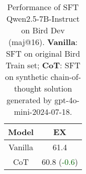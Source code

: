 \begin{table}[h!]
    \centering
\begin{adjustbox}{max width=\columnwidth}
    \begin{tabular}{c|c}
    \toprule
       \textbf{Model}  &  \textbf{EX} \\
    \midrule
        Vanilla & 61.4 \\
        CoT & 60.8 (\textcolor{darkgreen}{-0.6}) \\
    \bottomrule
    \end{tabular}
\end{adjustbox}
\caption{Performance of SFT Qwen2.5-7B-Instruct on Bird Dev (maj@16). \textbf{Vanilla}: SFT on original Bird Train set; \textbf{CoT}: SFT on synthetic chain-of-thought solution generated by gpt-4o-mini-2024-07-18. }
\end{table}